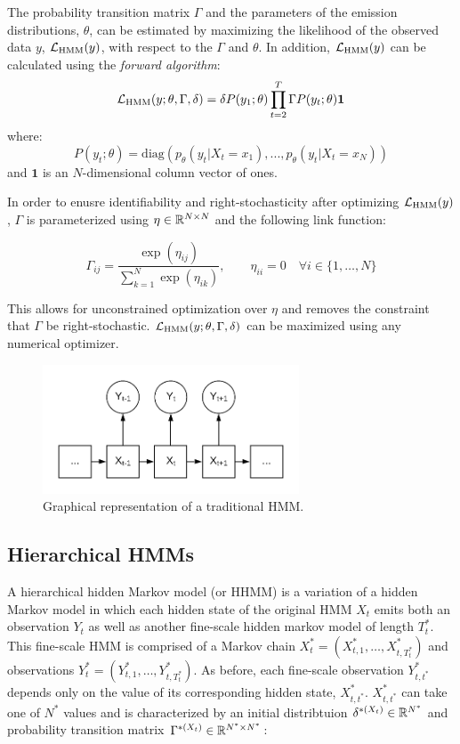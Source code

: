 The probability transition matrix $\Gamma$ and the parameters of the emission distributions, $\theta$, can be estimated by maximizing the likelihood of the observed data $y$, $\mathcal{L}_{\text{HMM}}(y)$, with respect to the $\Gamma$ and $\theta$. In addition, $\mathcal{L}_{\text{HMM}}(y)$ can be calculated using the \textit{forward algorithm}:
%
$$\mathcal{L}_{\text{HMM}}(y;\theta,\Gamma,\delta) = \delta P(y_1;\theta) \prod_{t=2}^T \Gamma P(y_t;\theta) \mathbf{1}$$
%
where:
%
$$P(y_t;\theta) = \text{diag}(p_{\theta}(y_t|X_t = x_1), . . . , p_{\theta}(y_t|X_t = x_N ))$$
%
and $\mathbf{1}$ is an $N$-dimensional column vector of ones.

In order to enusre identifiability and right-stochasticity after optimizing $\mathcal{L}_{\text{HMM}}(y)$, $\Gamma$ is parameterized using $\eta \in \mathbb{R}^{N \times N}$ and the following link function:

$$\Gamma_{ij} = \frac{\exp(\eta_{ij})}{\sum_{k=1}^N \exp(\eta_{ik})}, \qquad \eta_{ii} = 0 \quad \forall i \in \{1, \ldots, N\}$$

This allows for unconstrained optimization over $\eta$ and removes the constraint that $\Gamma$ be right-stochastic. $\mathcal{L}_{\text{HMM}}(y;\theta,\Gamma,\delta)$ can be maximized using any numerical optimizer.

\begin{figure}[h!]
	\centering
	\includegraphics[width=3in]{../../Plots/HMM.png}
	\caption{Graphical representation of a traditional HMM.}
	\label{fig:HMM}
\end{figure}


\subsection{Hierarchical HMMs}

A hierarchical hidden Markov model (or HHMM) is a variation of a hidden Markov model in which each hidden state of the original HMM $X_t$ emits both an observation $Y_t$ as well as another fine-scale hidden markov model of length $T^*_t$. This fine-scale HMM is comprised of a Markov chain $X^*_t = (X^*_{t,1}, \ldots, X^*_{t,T^*_t})$ and observations $Y^*_t = (Y^*_{t,1}, \ldots, Y^*_{t,T^*_t})$. As before, each fine-scale observation $Y^*_{t,t^*}$ depends only on the value of its corresponding hidden state, $X^*_{t,t^*}$. $X^*_{t,t^*}$ can take one of $N^*$ values and is characterized by an initial distribtuion $\delta^{*(X_t)} \in \mathbb{R}^{N^*}$ and probability transition matrix $\Gamma^{*(X_t)} \in \mathbb{R}^{N^* \times N^*}$:

